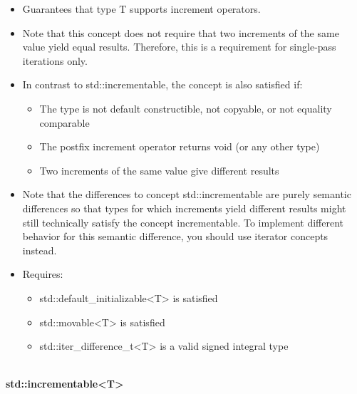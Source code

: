 \begin{itemize}
\item
Guarantees that type T supports increment operators.

\item
Note that this concept does not require that two increments of the same value yield equal results. Therefore, this is a requirement for single-pass iterations only.

\item
In contrast to std::incrementable, the concept is also satisfied if:

\begin{itemize}
\item
The type is not default constructible, not copyable, or not equality comparable

\item
The postfix increment operator returns void (or any other type)

\item
Two increments of the same value give different results
\end{itemize}

\item
Note that the differences to concept std::incrementable are purely semantic differences so that types for which increments yield different results might still technically satisfy the concept incrementable. To implement different behavior for this semantic difference, you should use iterator concepts instead.

\item
Requires:
\begin{itemize}
\item
std::default\_initializable<T> is satisfied

\item
std::movable<T> is satisfied

\item
std::iter\_difference\_t<T> is a valid signed integral type
\end{itemize}
\end{itemize}



\noindent
\hspace*{\fill} \\ %
\textbf{std::incrementable<T>}

